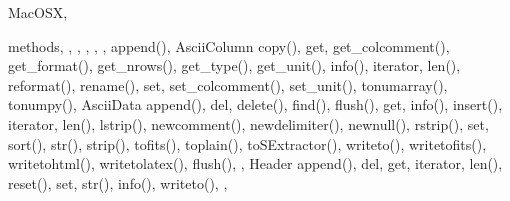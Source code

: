 \begin{theindex}
  \item MacOSX, 
  \item methods, , , , 
		, , 
    \subitem append(), 
    \subitem AsciiColumn
      \subsubitem copy(), 
      \subsubitem get, 
      \subsubitem get\_colcomment(), 
      \subsubitem get\_format(), 
      \subsubitem get\_nrows(), 
      \subsubitem get\_type(), 
      \subsubitem get\_unit(), 
      \subsubitem info(), 
      \subsubitem iterator, 
      \subsubitem len(), 
      \subsubitem reformat(), 
      \subsubitem rename(), 
      \subsubitem set, 
      \subsubitem set\_colcomment(), 
      \subsubitem set\_unit(), 
      \subsubitem tonumarray(), 
      \subsubitem tonumpy(), 
    \subitem AsciiData
      \subsubitem append(), 
      \subsubitem del, 
      \subsubitem delete(), 
      \subsubitem find(), 
      \subsubitem flush(), 
      \subsubitem get, 
      \subsubitem info(), 
      \subsubitem insert(), 
      \subsubitem iterator, 
      \subsubitem len(), 
      \subsubitem lstrip(), 
      \subsubitem newcomment(), 
      \subsubitem newdelimiter(), 
      \subsubitem newnull(), 
      \subsubitem rstrip(), 
      \subsubitem set, 
      \subsubitem sort(), 
      \subsubitem str(), 
      \subsubitem strip(), 
      \subsubitem tofits(), 
      \subsubitem toplain(), 
      \subsubitem toSExtractor(), 
      \subsubitem writeto(), 
      \subsubitem writetofits(), 
      \subsubitem writetohtml(), 
      \subsubitem writetolatex(), 
    \subitem flush(), , 
    \subitem Header
      \subsubitem append(), 
      \subsubitem del, 
      \subsubitem get, 
      \subsubitem iterator, 
      \subsubitem len(), 
      \subsubitem reset(), 
      \subsubitem set, 
      \subsubitem str(), 
    \subitem info(), 
    \subitem writeto(), , 


\end{theindex}
